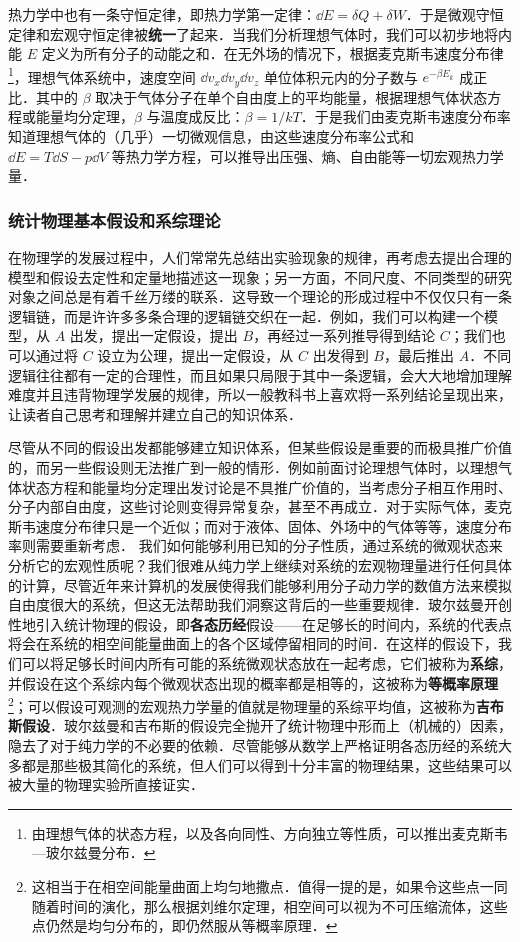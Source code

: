 热力学中也有一条守恒定律，即热力学第一定律：$\dd E=\delta Q+\delta W$．于是微观守恒定律和宏观守恒定律被\textbf{统一}了起来．当我们分析理想气体时，我们可以初步地将内能 $E$ 定义为所有分子的动能之和．在无外场的情况下，根据麦克斯韦速度分布律\footnote{由理想气体的状态方程，以及各向同性、方向独立等性质，可以推出麦克斯韦—玻尔兹曼分布．}，理想气体系统中，速度空间 $\dd v_x\dd v_y\dd v_z$ 单位体积元内的分子数与 $e^{-\beta E_k}$ 成正比．其中的 $\beta$ 取决于气体分子在单个自由度上的平均能量，根据理想气体状态方程或能量均分定理，$\beta$ 与温度成反比：$\beta=1/kT$．于是我们由麦克斯韦速度分布率知道理想气体的（几乎）一切微观信息，由这些速度分布率公式和 $\dd E=T\dd S-p\dd V$ 等热力学方程，可以推导出压强、熵、自由能等一切宏观热力学量．
\subsubsection{统计物理基本假设和系综理论}
在物理学的发展过程中，人们常常先总结出实验现象的规律，再考虑去提出合理的模型和假设去定性和定量地描述这一现象；另一方面，不同尺度、不同类型的研究对象之间总是有着千丝万缕的联系．这导致一个理论的形成过程中不仅仅只有一条逻辑链，而是许许多多条合理的逻辑链交织在一起．例如，我们可以构建一个模型，从 $A$ 出发，提出一定假设，提出 $B$，再经过一系列推导得到结论 $C$；我们也可以通过将 $C$ 设立为公理，提出一定假设，从 $C$ 出发得到 $B$，最后推出 $A$．不同逻辑往往都有一定的合理性，而且如果只局限于其中一条逻辑，会大大地增加理解难度并且违背物理学发展的规律，所以一般教科书上喜欢将一系列结论呈现出来，让读者自己思考和理解并建立自己的知识体系．

尽管从不同的假设出发都能够建立知识体系，但某些假设是重要的而极具推广价值的，而另一些假设则无法推广到一般的情形．例如前面讨论理想气体时，以理想气体状态方程和能量均分定理出发讨论是不具推广价值的，当考虑分子相互作用时、分子内部自由度，这些讨论则变得异常复杂，甚至不再成立．对于实际气体，麦克斯韦速度分布律只是一个近似；而对于液体、固体、外场中的气体等等，速度分布率则需要重新考虑． 我们如何能够利用已知的分子性质，通过系统的微观状态来分析它的宏观性质呢？我们很难从纯力学上继续对系统的宏观物理量进行任何具体的计算，尽管近年来计算机的发展使得我们能够利用分子动力学的数值方法来模拟自由度很大的系统，但这无法帮助我们洞察这背后的一些重要规律．玻尔兹曼开创性地引入统计物理的假设，即\textbf{各态历经}假设——在足够长的时间内，系统的代表点将会在系统的相空间能量曲面上的各个区域停留相同的时间．在这样的假设下，我们可以将足够长时间内所有可能的系统微观状态放在一起考虑，它们被称为\textbf{系综}，并假设在这个系综内每个微观状态出现的概率都是相等的，这被称为\textbf{等概率原理}\footnote{这相当于在相空间能量曲面上均匀地撒点．值得一提的是，如果令这些点一同随着时间的演化，那么根据刘维尔定理，相空间可以视为不可压缩流体，这些点仍然是均匀分布的，即仍然服从等概率原理．}；可以假设可观测的宏观热力学量的值就是物理量的系综平均值，这被称为\textbf{吉布斯假设}．玻尔兹曼和吉布斯的假设完全抛开了统计物理中形而上（机械的）因素，隐去了对于纯力学的不必要的依赖．尽管能够从数学上严格证明各态历经的系统大多都是那些极其简化的系统，但人们可以得到十分丰富的物理结果，这些结果可以被大量的物理实验所直接证实．

